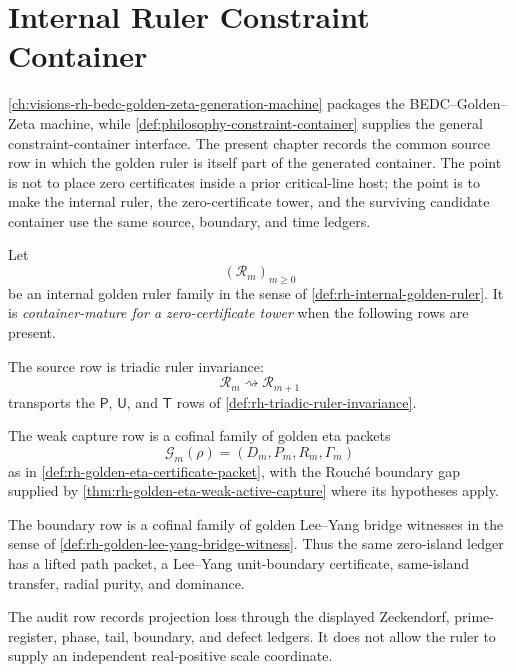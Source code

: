 \chapter{Internal Ruler Constraint Container}
\label{ch:visions-rh-internal-ruler-constraint-container}

\autoref{ch:visions-rh-bedc-golden-zeta-generation-machine} packages the
BEDC--Golden--Zeta machine, while
\autoref{def:philosophy-constraint-container} supplies the general
constraint-container interface.  The present chapter records the common
source row in which the golden ruler is itself part of the generated
container.  The point is not to place zero certificates inside a prior
critical-line host; the point is to make the internal ruler, the
zero-certificate tower, and the surviving candidate container use the
same source, boundary, and time ledgers.

\begin{definition}
\label{def:rh-container-mature-internal-ruler}
Let
$$
(\mathcal R_m)_{m\ge0}
$$
be an internal golden ruler family in the sense of
\autoref{def:rh-internal-golden-ruler}.  It is
\emph{container-mature for a zero-certificate tower} when the following
rows are present.

The source row is triadic ruler invariance:
$$
\mathcal R_m\rightsquigarrow\mathcal R_{m+1}
$$
transports the $\mathsf P$, $\mathsf U$, and $\mathsf T$ rows of
\autoref{def:rh-triadic-ruler-invariance}.

The weak capture row is a cofinal family of golden eta packets
$$
\mathcal G_m(\rho)=(D_m,P_m,R_m,\Gamma_m)
$$
as in \autoref{def:rh-golden-eta-certificate-packet}, with the Rouch\'e
boundary gap supplied by \autoref{thm:rh-golden-eta-weak-active-capture}
where its hypotheses apply.

The boundary row is a cofinal family of golden Lee--Yang bridge
witnesses in the sense of
\autoref{def:rh-golden-lee-yang-bridge-witness}.  Thus the same
zero-island ledger has a lifted path packet, a Lee--Yang unit-boundary
certificate, same-island transfer, radial purity, and dominance.

The audit row records projection loss through the displayed Zeckendorf,
prime-register, phase, tail, boundary, and defect ledgers.  It does not
allow the ruler to supply an independent real-positive scale coordinate.
\end{definition}

